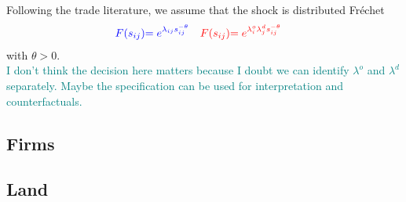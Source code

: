 \documentclass[12pt]{article}
\begin{document}
Following the trade literature, we assume that the shock is distributed Fréchet 
\begin{align*}
    \textcolor{blue}{F(s_{ij})} &\textcolor{blue}{= e^{\lambda_{ij}s_{ij}^{-\theta}}} & \textcolor{red}{F(s_{ij})} &\textcolor{red}{= e^{\lambda^o_{i}\lambda^d_js_{ij}^{-\theta}}}
\end{align*}
with $\theta>0$. \\ 
\textcolor{teal}{I don't think the decision here matters because I doubt we can identify $\lambda^o$ and $\lambda^d$ separately. Maybe the specification can be used for interpretation and counterfactuals.}



\subsection{Firms}

\subsection{Land}
\end{document}
